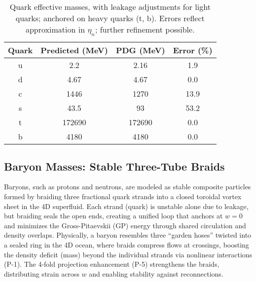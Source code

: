\begin{table}[h!]
\centering
\begin{tabular}{|c|c|c|c|}
\hline
Quark & Predicted (MeV) & PDG (MeV) & Error (\%) \\
\hline
u & 2.2 & 2.16 & 1.9 \\
d & 4.67 & 4.67 & 0.0 \\
c & 1446 & 1270 & 13.9 \\
s & 43.5 & 93 & 53.2 \\
t & 172690 & 172690 & 0.0 \\
b & 4180 & 4180 & 0.0 \\
\hline
\end{tabular}
\caption{Quark effective masses, with leakage adjustments for light quarks; anchored on heavy quarks (t, b). Errors reflect approximation in $\eta_n$; further refinement possible.}
\label{tab:quarks}
\end{table}


\subsection{Baryon Masses: Stable Three-Tube Braids}

Baryons, such as protons and neutrons, are modeled as stable composite particles formed by braiding three fractional quark strands into a closed toroidal vortex sheet in the 4D superfluid. Each strand (quark) is unstable alone due to leakage, but braiding seals the open ends, creating a unified loop that anchors at $w=0$ and minimizes the Gross-Pitaevskii (GP) energy through shared circulation and density overlaps. Physically, a baryon resembles three ``garden hoses'' twisted into a sealed ring in the 4D ocean, where braids compress flows at crossings, boosting the density deficit (mass) beyond the individual strands via nonlinear interactions (P-1). The 4-fold projection enhancement (P-5) strengthens the braids, distributing strain across $w$ and enabling stability against reconnections.

